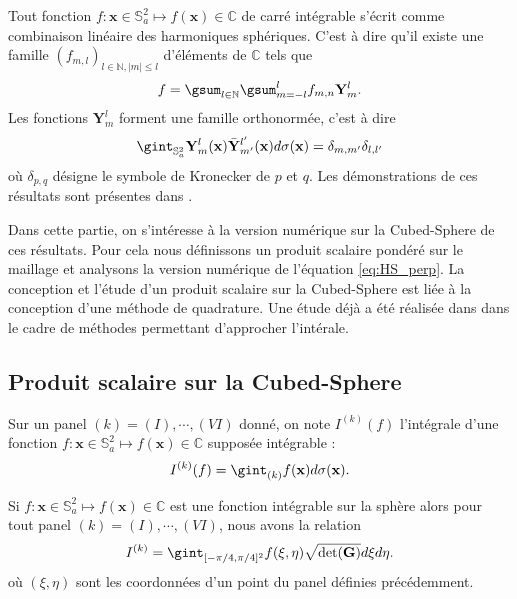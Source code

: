 Tout fonction $f : \mathbf{x} \in \mathbb{S}_a^2 \mapsto f(\mathbf{x}) \in \mathbb{C}$ de carré intégrable s'écrit comme combinaison linéaire des harmoniques sphériques. C'est à dire qu'il existe une famille $(f_{m,l})_{l \in \mathbb{N}, |m| \leq l}$ d'éléments de $\mathbb{C}$ tels que
\begin{equation}
f = \gsum_{l \in \mathbb{N}} \gsum_{m= -l}^l f_{m,n} \mathbf{Y}^l_m.
\end{equation}
Les fonctions $\mathbf{Y}^l_m$ forment une famille orthonormée, c'est à dire
\begin{equation}
\gint_{\mathbb{S}_a^2} \mathbf{Y}^l_m(\mathbf{x}) \bar{\mathbf{Y}}^{l'}_{m'}(\mathbf{x}) d \sigma (\mathbf{x}) = \delta_{m, m'}\delta_{l, l'}
\label{eq:HS_perp}
\end{equation}
où $\delta_{p,q}$ désigne le symbole de Kronecker de $p$ et $q$. Les démonstrations de ces résultats sont présentes dans \cite{Atkinson2012}.

Dans cette partie, on s'intéresse à la version numérique sur la Cubed-Sphere de ces résultats. Pour cela nous définissons un produit scalaire pondéré sur le maillage et analysons la version numérique de l'équation \eqref{eq:HS_perp}. La conception et l'étude d'un produit scalaire sur la Cubed-Sphere est liée à la conception d'une méthode de quadrature. Une étude déjà a été réalisée dans \cite{Portelenelle2018} dans le cadre de méthodes permettant d'approcher l'intérale.

\subsection{Produit scalaire sur la Cubed-Sphere}

Sur un panel $(k) = (I), \cdots , (VI)$ donné, on note $I^{(k)}(f)$ l'intégrale d'une fonction $f : \mathbf{x} \in \mathbb{S}_a^2 \mapsto f(\mathbf{x}) \in \mathbb{C}$ supposée intégrable :
\begin{equation}
I^{(k)}(f) = \gint_{(k)}f(\mathbf{x}) d\sigma(\mathbf{x}).
\end{equation}

\begin{proposition}
Si  $f : \mathbf{x} \in \mathbb{S}_a^2 \mapsto f(\mathbf{x}) \in \mathbb{C}$ est une fonction intégrable sur la sphère alors pour tout panel $(k)=(I), \cdots, (VI)$, nous avons la relation
\begin{equation}
I^{(k)} = \gint_{[-\pi/4, \pi/4]^2} f(\xi, \eta) \sqrt{\det (\mathbf{G})} d\xi d\eta.
\end{equation}
où $(\xi, \eta)$ sont les coordonnées d'un point du panel définies précédemment.
\end{proposition}

